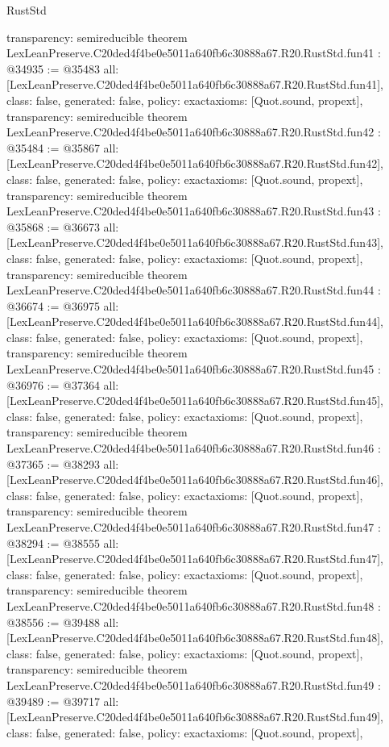 \begin{lexlean}{RustStd}
\begin{coremodule}
{  transparency: semireducible
}
theorem LexLeanPreserve.C20ded4f4be0e5011a640fb6c30888a67.R20.RustStd.fun41 : @34935 := @35483 {
  all: [LexLeanPreserve.C20ded4f4be0e5011a640fb6c30888a67.R20.RustStd.fun41],
  class: false,
  generated: false,
  policy: exact{axioms: [Quot.sound, propext]},
  transparency: semireducible
}
theorem LexLeanPreserve.C20ded4f4be0e5011a640fb6c30888a67.R20.RustStd.fun42 : @35484 := @35867 {
  all: [LexLeanPreserve.C20ded4f4be0e5011a640fb6c30888a67.R20.RustStd.fun42],
  class: false,
  generated: false,
  policy: exact{axioms: [Quot.sound, propext]},
  transparency: semireducible
}
theorem LexLeanPreserve.C20ded4f4be0e5011a640fb6c30888a67.R20.RustStd.fun43 : @35868 := @36673 {
  all: [LexLeanPreserve.C20ded4f4be0e5011a640fb6c30888a67.R20.RustStd.fun43],
  class: false,
  generated: false,
  policy: exact{axioms: [Quot.sound, propext]},
  transparency: semireducible
}
theorem LexLeanPreserve.C20ded4f4be0e5011a640fb6c30888a67.R20.RustStd.fun44 : @36674 := @36975 {
  all: [LexLeanPreserve.C20ded4f4be0e5011a640fb6c30888a67.R20.RustStd.fun44],
  class: false,
  generated: false,
  policy: exact{axioms: [Quot.sound, propext]},
  transparency: semireducible
}
theorem LexLeanPreserve.C20ded4f4be0e5011a640fb6c30888a67.R20.RustStd.fun45 : @36976 := @37364 {
  all: [LexLeanPreserve.C20ded4f4be0e5011a640fb6c30888a67.R20.RustStd.fun45],
  class: false,
  generated: false,
  policy: exact{axioms: [Quot.sound, propext]},
  transparency: semireducible
}
theorem LexLeanPreserve.C20ded4f4be0e5011a640fb6c30888a67.R20.RustStd.fun46 : @37365 := @38293 {
  all: [LexLeanPreserve.C20ded4f4be0e5011a640fb6c30888a67.R20.RustStd.fun46],
  class: false,
  generated: false,
  policy: exact{axioms: [Quot.sound, propext]},
  transparency: semireducible
}
theorem LexLeanPreserve.C20ded4f4be0e5011a640fb6c30888a67.R20.RustStd.fun47 : @38294 := @38555 {
  all: [LexLeanPreserve.C20ded4f4be0e5011a640fb6c30888a67.R20.RustStd.fun47],
  class: false,
  generated: false,
  policy: exact{axioms: [Quot.sound, propext]},
  transparency: semireducible
}
theorem LexLeanPreserve.C20ded4f4be0e5011a640fb6c30888a67.R20.RustStd.fun48 : @38556 := @39488 {
  all: [LexLeanPreserve.C20ded4f4be0e5011a640fb6c30888a67.R20.RustStd.fun48],
  class: false,
  generated: false,
  policy: exact{axioms: [Quot.sound, propext]},
  transparency: semireducible
}
theorem LexLeanPreserve.C20ded4f4be0e5011a640fb6c30888a67.R20.RustStd.fun49 : @39489 := @39717 {
  all: [LexLeanPreserve.C20ded4f4be0e5011a640fb6c30888a67.R20.RustStd.fun49],
  class: false,
  generated: false,
  policy: exact{axioms: [Quot.sound, propext]},
}
\end{coremodule}
\end{lexlean}
